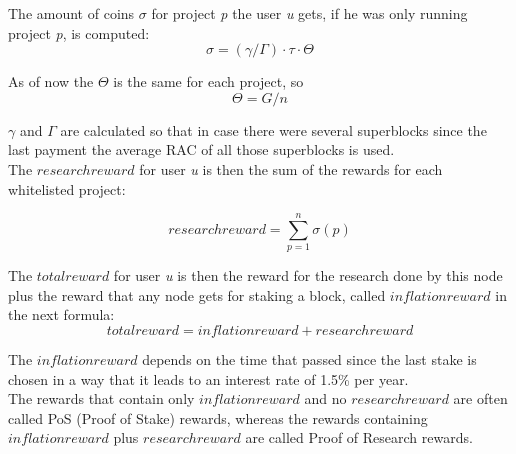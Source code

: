The amount of coins $\sigma$ for project \textit{p} the user \textit{u} gets, if he was only running project \textit{p}, is computed:
\[ \sigma = (\gamma / \Gamma) \cdot \tau \cdot \Theta \]

As of now the $\Theta$ is the same for each project, so
\[ \Theta = G/n \]

$\gamma$ and $\Gamma$ are calculated so that in case there were several superblocks since the last payment the average RAC of all those superblocks is used.\\

The $researchreward$ for user \textit{u} is then the sum of the rewards for each whitelisted project:

\[ researchreward = \sum_{p=1}^{n} \sigma(p) \]


The $totalreward$  for user \textit{u} is then the reward for the research done by this node plus the reward that any node gets for staking a block, called $inflationreward$ in the next formula:
\[ totalreward = inflationreward +  researchreward \]

The $inflationreward$ depends on the time that passed since the last stake is chosen in a way that it leads to an interest rate of 1.5\% per year.\\

The rewards that contain only $inflationreward$ and no $researchreward$
are often called PoS (Proof of Stake) rewards, whereas the rewards containing $inflationreward$ plus $researchreward$ are called Proof of Research rewards.
